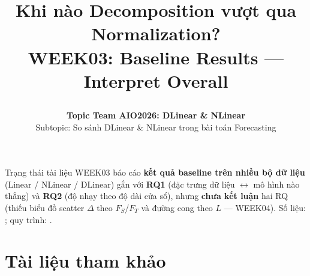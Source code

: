 \documentclass[12pt]{article}
\title{%
  \parbox[c][\TitleBlockHeight][c]{0.90\textwidth}{%
    \centering
    {\fontsize{18pt}{22pt}\selectfont\bfseries
      Khi nào Decomposition vượt qua Normalization?}\\[0.35em]
    {\fontsize{13pt}{16pt}\selectfont
      WEEK03: Baseline Results --- Interpret Overall}
  }%
}
\author{%
  \textbf{Topic Team AIO2026: DLinear \& NLinear}\\[0.4em]
  {\small Subtopic: So sánh DLinear \& NLinear trong bài toán Forecasting}
}
\date{}
\begin{document}
\maketitle
\thispagestyle{firstpage}
\vspace{-2em}

\begin{infobox}{Trạng thái tài liệu}
  WEEK03 báo cáo \textbf{kết quả baseline trên nhiều bộ dữ liệu} (Linear / NLinear / DLinear)
  gắn với \textbf{RQ1} (đặc trưng dữ liệu \(\leftrightarrow\) mô hình nào thắng)
  và \textbf{RQ2} (độ nhạy theo độ dài cửa sổ), nhưng \textbf{chưa kết luận} hai RQ
  (thiếu biểu đồ scatter \(\Delta\) theo \(F_S\)/\(F_T\) và đường cong theo \(L\) --- WEEK04).
  Số liệu: ;
  quy trình: .
\end{infobox}






\section*{Tài liệu tham khảo}
\printbibliography[heading=none]
\end{document}
